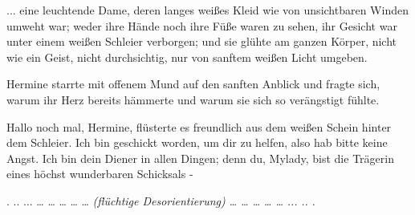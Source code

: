 ... eine leuchtende Dame, deren langes weißes Kleid wie von unsichtbaren Winden
umweht war; weder ihre Hände noch ihre Füße waren zu sehen, ihr Gesicht war
unter einem weißen Schleier verborgen; und sie glühte am ganzen Körper, nicht
wie ein Geist, nicht durchsichtig, nur von sanftem weißen Licht umgeben.

Hermine starrte mit offenem Mund auf den sanften Anblick und fragte sich, warum
ihr Herz bereits hämmerte und warum sie sich so verängstigt fühlte.

\glqq Hallo noch mal, Hermine\grqq{}, flüsterte es freundlich aus dem weißen
Schein hinter dem Schleier. \glqq Ich bin geschickt worden, um dir zu helfen,
also hab bitte keine Angst. Ich bin dein Diener in allen Dingen; denn du,
Mylady, bist die Trägerin eines höchst wunderbaren Schicksals -\grqq{}

. .. ... … … … … …
\emph{(flüchtige Desorientierung)}
\emph{… … … }
\emph{… …}
\emph{... }
\emph{..}
\emph{.}

